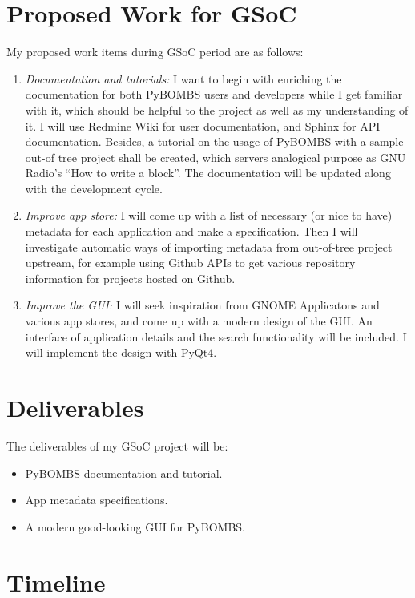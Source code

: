 \documentclass[a4paper]{article}
\begin{document}
\section{Proposed Work for GSoC}

My proposed work items during GSoC period are as follows:

\begin{enumerate}
  \item \emph{Documentation and tutorials:} I want to begin with
    enriching the documentation for both PyBOMBS users and developers
    while I get familiar with it, which should be helpful to the
    project as well as my understanding of it. I will use Redmine Wiki
    for user documentation, and Sphinx for API documentation.
    Besides, a tutorial on the usage of PyBOMBS with a sample out-of\-
    tree project shall be created, which servers analogical purpose as
    GNU Radio's ``How to write a block''. The documentation will be
    updated along with the development cycle.
  \item \emph{Improve app store:} I will come up with a list of
    necessary (or nice to have) metadata for each application and make a
    specification. Then I will investigate automatic ways of importing
    metadata from out-of-tree project upstream, for example using Github
    APIs to get various repository information for projects hosted on
    Github.
  \item \emph{Improve the GUI:} I will seek inspiration from GNOME
    Applicatons and various app stores, and come up with a modern design
    of the GUI. An interface of application details and the search
    functionality will be included. I will implement the design with
    PyQt4.
\end{enumerate}

\section{Deliverables}

The deliverables of my GSoC project will be:
\begin{itemize}
  \item PyBOMBS documentation and tutorial.
  \item App metadata specifications.
  \item A modern good-looking GUI for PyBOMBS.
\end{itemize}

\section{Timeline}
\end{document}
